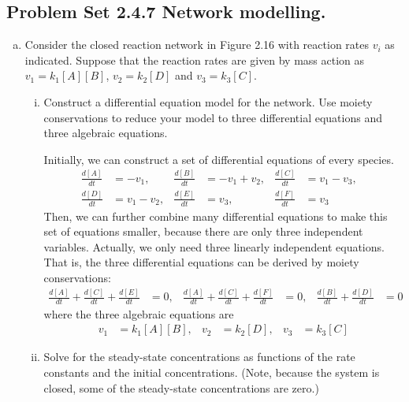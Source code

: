 \documentclass[paper=a4, fontsize=11pt]{scrartcl} %
\numberwithin{equation}{section} %
\numberwithin{figure}{section} %
\numberwithin{table}{section} %
\begin{document}
\begin{center}
\begin{tabular}{| l | l | l | l |}
    \end{tabular}
\end{center}

\subsection{Problem Set 2.4.7 Network modelling.}
	\begin{enumerate}[a)]
		\item Consider the closed reaction network in Figure 2.16 with reaction rates $v_{i}$ as indicated. Suppose that the reaction rates are given by mass action as $v_{1}= k_{1}\left[ A \right]\left[ B \right]$, $v_{2} = k_{2}\left[ D \right]$ and $v_{3} = k_{3}\left[ C \right]$.
		\begin{enumerate}[i)]
			\item Construct a differential equation model for the network. Use moiety conservations to reduce your model to three differential equations and three algebraic equations.

			Initially, we can construct a set of differential equations of every species.
			\begin{align*}
				\frac{d\left[ A \right]}{dt}&=-v_{1},&\frac{d\left[ B \right]}{dt}&=-v_{1}+v_{2},&
				\frac{d\left[ C \right]}{dt}&=v_{1}-v_{3},&\\
				\frac{d\left[ D \right]}{dt}&=v_{1}-v_{2},&\frac{d\left[ E \right]}{dt}&=v_{3},&
				\frac{d\left[ F \right]}{dt}&=v_{3}
			\end{align*}
			Then, we can further combine many differential equations to make this set of equations smaller, because there are only three independent variables. Actually, we only need three linearly independent equations. That is, the three differential equations can be derived by moiety conservations: \\
			\begin{align*}
				\frac{d\left[ A \right]}{dt}+\frac{d\left[ C \right]}{dt}+\frac{d\left[ E \right]}{dt}&=0,&
				\frac{d\left[ A \right]}{dt}+\frac{d\left[ C \right]}{dt}+\frac{d\left[ F \right]}{dt}&=0,&
				\frac{d\left[ B \right]}{dt}+\frac{d\left[ D \right]}{dt}&=0&
			\end{align*}
			where the three algebraic equations are
			\begin{align*}
				v_{1}&=k_{1}\left[ A \right]\left[ B \right],&v_{2}&=k_{2}\left[ D \right],&v_{3}&=k_{3}\left[ C \right]
			\end{align*}

			\item Solve for the steady-state concentrations as functions of the rate constants and the initial concentrations. (Note, because the system is closed, some of the steady-state concentrations are zero.)


\end{enumerate}
\end{enumerate}
\end{document}
